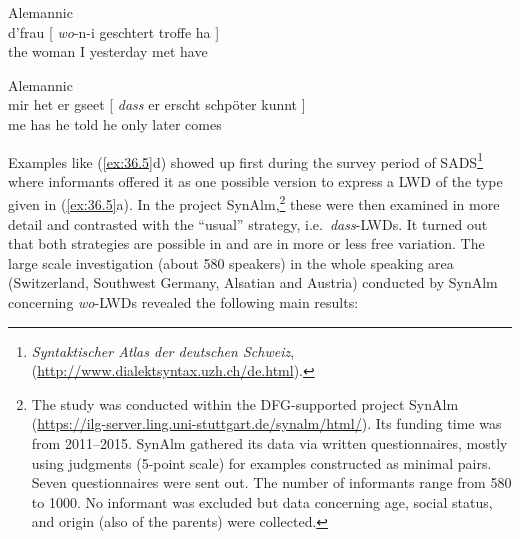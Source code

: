 \documentclass[output=paper]{langsci/langscibook}
\begin{document}
\ea\label{ex:36.6} Alemannic\\
    \gll d'frau [ \textit{wo}-n-i geschtert \underline{\hphantom{2em}} troffe ha ] \\
    {the woman} {} {\Rci{}\hphantom{-n-}I} yesterday met have \\
\z

\ea\label{ex:36.7} Alemannic\\
    \gll mir het er gseet [ \textit{dass} er erscht schpöter kunnt ]\\
        me has he told {} \Cci{} he only later comes \\
\z

Examples like (\ref{ex:36.5}d) showed up first during the survey period of
SADS\footnote{\emph{Syntaktischer Atlas der deutschen Schweiz}, 
(\url{http://www.dialektsyntax.uzh.ch/de.html}).} where informants offered it
as one possible version to express a \gls{LWD} of the type given in
(\ref{ex:36.5}a). In the project SynAlm,\footnote{The study was conducted
    within the DFG-supported project SynAlm {\sloppy
    (\url{https://ilg-server.ling.uni-stuttgart.de/synalm/html/})}. Its funding
    time was from 2011--2015. SynAlm gathered its data via written
    questionnaires, mostly using judgments (5-point scale) for examples
    constructed as minimal pairs. Seven questionnaires were sent out. The
number of informants range from 580 to 1000. No informant was excluded but data
concerning age, social status, and origin (also of the parents) were
collected.} these were then examined in more detail and contrasted with the
\enquote{usual} strategy, i.e.\ \emph{dass}-\glspl{LWD}. It turned out that both
strategies are possible in  and are in more or less free
variation. The large scale investigation (about 580 speakers) in the whole
 speaking area (Switzerland, Southwest Germany, Alsatian and
Austria) conducted by SynAlm concerning \emph{wo}-\glspl{LWD} revealed the
following main results:
\end{document}
